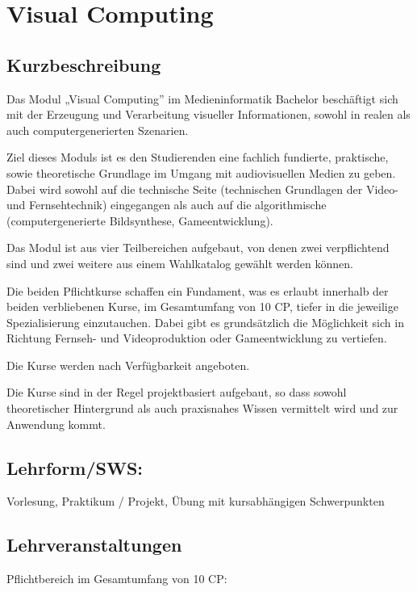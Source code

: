 \chapter{Visual Computing}\label{visual-computing}

\section*{Kurzbeschreibung}\label{kurzbeschreibung-4}

Das Modul „Visual Computing'' im Medieninformatik Bachelor beschäftigt
sich mit der Erzeugung und Verarbeitung visueller Informationen, sowohl
in realen als auch computergenerierten Szenarien.

Ziel dieses Moduls ist es den Studierenden eine fachlich fundierte,
praktische, sowie theoretische Grundlage im Umgang mit audiovisuellen
Medien zu geben. Dabei wird sowohl auf die technische Seite (technischen
Grundlagen der Video- und Fernsehtechnik) eingegangen als auch auf die
algorithmische (computergenerierte Bildsynthese, Gameentwicklung).

Das Modul ist aus vier Teilbereichen aufgebaut, von denen zwei
verpflichtend sind und zwei weitere aus einem Wahlkatalog gewählt werden
können.

Die beiden Pflichtkurse schaffen ein Fundament, was es erlaubt innerhalb
der beiden verbliebenen Kurse, im Gesamtumfang von 10 CP, tiefer in die
jeweilige Spezialisierung einzutauchen. Dabei gibt es grundsätzlich die
Möglichkeit sich in Richtung Fernseh- und Videoproduktion oder
Gameentwicklung zu vertiefen.

Die Kurse werden nach Verfügbarkeit angeboten.

Die Kurse sind in der Regel projektbasiert aufgebaut, so dass sowohl
theoretischer Hintergrund als auch praxisnahes Wissen vermittelt wird
und zur Anwendung kommt.

\section*{Lehrform/SWS:}\label{lehrformsws-25}

Vorlesung, Praktikum / Projekt, Übung mit kursabhängigen Schwerpunkten

\section*{Lehrveranstaltungen}\label{lehrveranstaltungen}

Pflichtbereich im Gesamtumfang von 10 CP:

